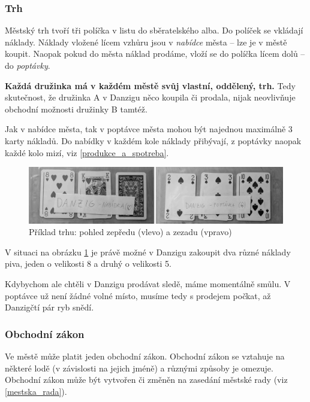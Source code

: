 \documentclass[a4paper, 12pt, twoside]{article}
\begin{document}
\subsubsection{Trh}
\label{trh}

Městský trh tvoří tři políčka v listu do sběratelského alba.  
Do políček se vkládají náklady.  Náklady vložené lícem vzhůru jsou v \emph{nabídce} města -- lze je v městě koupit.  
Naopak pokud do města náklad prodáme, vloží se do políčka lícem dolů -- do \emph{poptávky}.

\textbf{Každá družinka má v každém městě svůj vlastní, oddělený, trh.}  Tedy skutečnost, že družinka A v Danzigu něco koupila či prodala, nijak neovlivňuje
obchodní možnosti družinky B tamtéž.

Jak v nabídce města, tak v poptávce města mohou být najednou maximálně 3 karty nákladů.  Do nabídky v každém kole náklady přibývají, z poptávky naopak každé
kolo mizí, viz \ref{produkce_a_spotreba}.

\begin{figure}[h!]
\centering
\includegraphics[width=1\textwidth]{figs/trhv2G.png}
\vspace{-0.7cm}
\caption{Příklad trhu: pohled zepředu (vlevo) a zezadu (vpravo)}
\vspace{-0.2cm}
\label{trh_img}
\end{figure}

V situaci na obrázku \ref{trh_img} je právě možné v Danzigu zakoupit dva různé náklady piva, jeden o velikosti 8 a druhý o velikosti 5.

Kdybychom ale chtěli v Danzigu prodávat sledě, máme momentálně smůlu.  V poptávce už není žádné volné místo, musíme tedy s prodejem
počkat, až Danzigčtí pár ryb snědí.

\subsubsection{Obchodní zákon}

Ve městě může platit jeden obchodní zákon.  Obchodní zákon se vztahuje na některé lodě 
(v závislosti na jejich jméně) a různými způsoby je omezuje.
Obchodní zákon může být vytvořen či změněn na zasedání městské rady (viz \ref{mestska_rada}).
\end{document}
